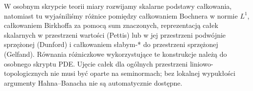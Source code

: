\begin{uwaga}
W osobnym skrypcie teorii miary rozwijamy skalarne podstawy
całkowania, natomiast tu wyjaśniliśmy różnice pomiędzy
całkowaniem Bochnera w normie $L^1$, całkowaniem
Birkhoffa za pomocą sum znaczonych, reprezentacją całek
skalarnych w przestrzeni wartości (Pettis) lub w jej
przestrzeni podwójnie sprzężonej (Dunford)
i całkowaniem słabym-* do przestrzeni sprzężonej (Gelfand).
Równania różniczkowe wykorzystujące te konstrukcje należą
do osobnego skryptu PDE. Ujęcie całek dla ogólnych przestrzeni
liniowo-topologicznych nie musi być oparte na seminormach;
bez lokalnej wypukłości argumenty Hahna--Banacha nie są
automatycznie dostępne.
\end{uwaga}

\addtocounter{section}{-1}
\endgroup
